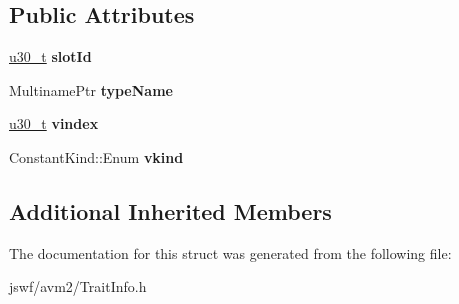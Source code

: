 \subsection*{Public Attributes}
\begin{DoxyCompactItemize}
\item 
\hypertarget{structjswf_1_1avm2_1_1_slot_trait_info_a23445dface4675f7edbad6a66b618ab2}{\hyperlink{namespacejswf_aa10d9ddca2a6a5debdc261dfae3d1117}{u30\+\_\+t} {\bfseries slot\+Id}}\label{structjswf_1_1avm2_1_1_slot_trait_info_a23445dface4675f7edbad6a66b618ab2}

\item 
\hypertarget{structjswf_1_1avm2_1_1_slot_trait_info_a334a9997d7e723980dec3dacdfac6634}{Multiname\+Ptr {\bfseries type\+Name}}\label{structjswf_1_1avm2_1_1_slot_trait_info_a334a9997d7e723980dec3dacdfac6634}

\item 
\hypertarget{structjswf_1_1avm2_1_1_slot_trait_info_aa0e22565f18c3229e1ba57ee139a8ad8}{\hyperlink{namespacejswf_aa10d9ddca2a6a5debdc261dfae3d1117}{u30\+\_\+t} {\bfseries vindex}}\label{structjswf_1_1avm2_1_1_slot_trait_info_aa0e22565f18c3229e1ba57ee139a8ad8}

\item 
\hypertarget{structjswf_1_1avm2_1_1_slot_trait_info_ae305362306034958c598be0b9380dae4}{Constant\+Kind\+::\+Enum {\bfseries vkind}}\label{structjswf_1_1avm2_1_1_slot_trait_info_ae305362306034958c598be0b9380dae4}

\end{DoxyCompactItemize}
\subsection*{Additional Inherited Members}


The documentation for this struct was generated from the following file\+:\begin{DoxyCompactItemize}
\item 
jswf/avm2/Trait\+Info.\+h\end{DoxyCompactItemize}
